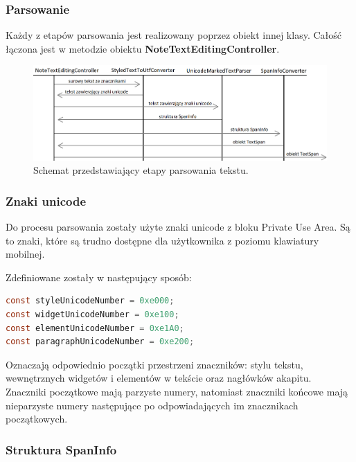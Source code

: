 \subsubsection{Parsowanie}

Każdy z etapów parsowania jest realizowany poprzez obiekt innej klasy. Całość łączona jest w metodzie obiektu \textbf{NoteTextEditingController}.
\newline
\begin{figure}[ht]
    \centering
    \includegraphics[width=\linewidth]{images/etapy_parsowania.png}
    \caption{Schemat przedstawiający etapy parsowania tekstu.}
    \label{fig:etapyParsowania}
\end{figure}

\subsubsection{Znaki unicode}

Do procesu parsowania zostały użyte znaki unicode z bloku Private Use Area. Są to znaki, które są trudno dostępne dla użytkownika z poziomu klawiatury mobilnej.

\noindent Zdefiniowane zostały w następujący sposób:

\begin{lstlisting}[language=java]
const styleUnicodeNumber = 0xe000;
const widgetUnicodeNumber = 0xe100;
const elementUnicodeNumber = 0xe1A0;
const paragraphUnicodeNumber = 0xe200;
\end{lstlisting}

Oznaczają odpowiednio początki przestrzeni znaczników: stylu tekstu, wewnętrznych widgetów i elementów w tekście oraz nagłówków akapitu.
Znaczniki początkowe mają parzyste numery, natomiast znaczniki końcowe mają nieparzyste numery następujące po odpowiadających im znacznikach początkowych.


\subsubsection{Struktura SpanInfo}

